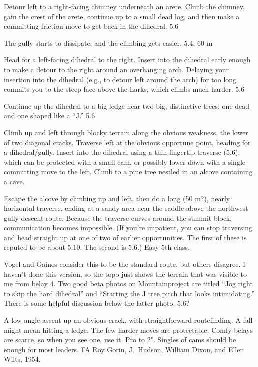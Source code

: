 \documentclass{tahquitz}
\begin{document}
  Detour left to a right-facing chimney underneath an arete.
Climb the chimney, gain the crest of the arete, continue up
to a small dead log, and then make a committing friction
move to get back in the dihedral. 5.6

 The gully starts to dissipate, and the climbing gets easier.
5.4, 60 m

 Head for a left-facing dihedral to the right.
Insert into the dihedral early enough to make a detour to the right around an overhanging arch. 
Delaying your insertion into the dihedral (e.g., to detour left around the arch) for too long
commits you to the steep face above the Larks, which climbs much harder. 5.6

 Continue up the dihedral to a big ledge near two big, distinctive
trees: one dead and one shaped like a ``J.'' 5.6

 Climb up and left through blocky terrain along the obvious weakness, the
lower of two diagonal cracks. Traverse left at the obvious opportune point, heading
for a dihedral/gully. Insert into the dihedral using a thin fingertip traverse (5.6),
which can be protected with a small cam, or possibly lower down with a single committing
move to the left. Climb to a pine tree nestled in an alcove containing a cave.

 Escape the alcove by climbing up and left, then do a long (50 m?), nearly
horizontal traverse, ending at a sandy area near the saddle above the northwest gully
descent route. Because the traverse curves around the summit block, communication
becomes impossible. (If you're impatient, you can stop traversing and head straight up
at one of two of earlier opportunities. The first of these is reputed to be about 5.10.
The second is 5.6.) Easy 5th class.

 Vogel and Gaines consider this to be the standard route, but others disagree.
I haven't done this version, so the topo just shows the terrain that was visible
to me from belay 4. Two good beta
photos on Mountainproject are titled ``Jog right to skip the hard dihedral''
and ``Starting the J tree pitch that looks intimidating.''
There is some helpful discussion below the latter photo. 5.6?




A low-angle ascent up an obvious crack, with straightforward routefinding.
A fall might mean hitting a ledge. The few harder moves
are protectable. Comfy belays are scarce, so when you see one, use
it. Pro to 2". Singles of cams should be enough for most leaders.
FA Roy Gorin, J.~Hudson, William Dixon, and Ellen Wilts, 1954.
\end{document}
